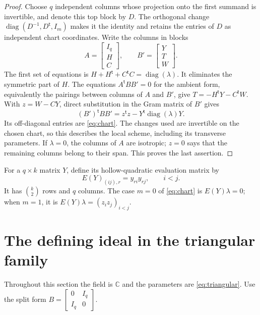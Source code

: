 \documentclass[11pt]{article}
\theoremstyle{definition}
\theoremstyle{remark}
\numberwithin{equation}{section}
\DeclareMathOperator{\diag}{diag}
\newcommand{\CC}{\mathbb C}
\newcommand{\T}{\mathsf T}
\begin{document}
\begin{proof}
Choose $q$ independent columns whose projection onto the first summand
is invertible, and denote this top block by $D$. The orthogonal change
$\diag(D^{-1},D^{\mathsf t},I_m)$ makes it the identity and retains
the entries of $D$ as independent chart coordinates. Write the columns
in blocks
\[
 A=\begin{bmatrix}I_q\\H\\C\end{bmatrix},\qquad
 B'=\begin{bmatrix}Y\\T\\W\end{bmatrix}.
\]
The first set of equations is
$H+H^{\mathsf t}+C^{\mathsf t}C=\diag(\lambda)$.
It eliminates the symmetric part of $H$. The equations
$A^{\mathsf t}BB'=0$ for the ambient form, equivalently the pairings
between columns of $A$ and $B'$, give
$T=-H^{\mathsf t}Y-C^{\mathsf t}W$.
With $z=W-CY$, direct substitution in the Gram matrix of $B'$ gives
\[
 (B')^{\mathsf t}BB'=z^{\mathsf t}z-Y^{\mathsf t}\diag(\lambda)Y.
\]
Its off-diagonal entries are \eqref{eq:chart}. The changes used are
invertible on the chosen chart, so this describes the local scheme,
including its transverse parameters. If $\lambda=0$, the columns of
$A$ are isotropic; $z=0$ says that the remaining columns belong to
their span. This proves the last assertion.
\end{proof}

For a $q\times k$ matrix $Y$, define its hollow-quadratic evaluation
matrix by
\begin{equation}\label{eq:E}
 E(Y)_{(ij),r}=y_{ri}y_{rj},\qquad i<j.
\end{equation}
It has $\binom k2$ rows and $q$ columns. The case $m=0$ of
\eqref{eq:chart} is $E(Y)\lambda=0$; when $m=1$, it is
$E(Y)\lambda=(z_i z_j)_{i<j}$.

\section{The defining ideal in the triangular family}\label{sec:ideal}

Throughout this section the field is $\CC$ and the parameters are
\eqref{eq:triangular}. Use the split form
$B=\left[\begin{smallmatrix}0&I_q\\I_q&0\end{smallmatrix}\right]$.
\end{document}
